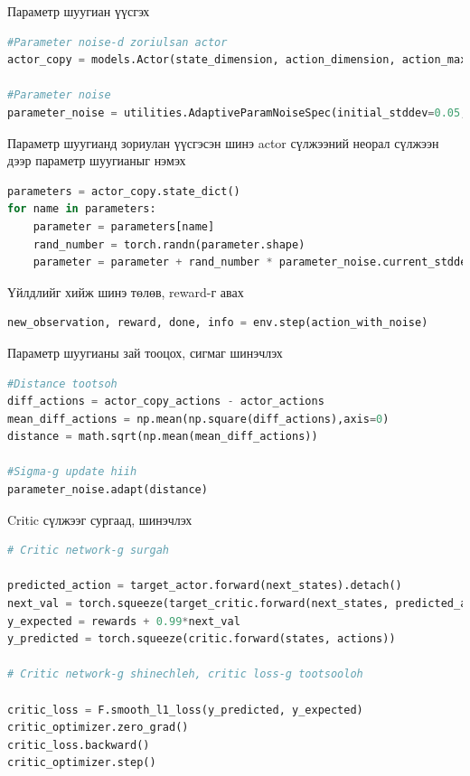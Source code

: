 \documentclass[12pt,A4]{report}
\begin{document}
Параметр шуугиан үүсгэх

\begin{lstlisting}[language=Python, caption=Үйлдэл дээр шуугиан нэмэх, frame=single]
#Parameter noise-d zoriulsan actor
actor_copy = models.Actor(state_dimension, action_dimension, action_max)

#Parameter noise
parameter_noise = utilities.AdaptiveParamNoiseSpec(initial_stddev=0.05,desired_action_stddev=0.3, adaptation_coefficient=1.05)
\end{lstlisting}

Параметр шуугианд зориулан үүсгэсэн шинэ actor сүлжээний неорал сүлжээн дээр параметр шуугианыг нэмэх

\begin{lstlisting}[language=Python, caption=Үйлдэл хийх, frame=single]
parameters = actor_copy.state_dict()
for name in parameters:
    parameter = parameters[name]
    rand_number = torch.randn(parameter.shape)
    parameter = parameter + rand_number * parameter_noise.current_stddev
\end{lstlisting}

Үйлдлийг хийж шинэ төлөв, reward-г авах

\begin{lstlisting}[language=Python, caption=Үйлдэл хийх, frame=single]
new_observation, reward, done, info = env.step(action_with_noise)
\end{lstlisting}

Параметр шуугианы зай тооцох, сигмаг шинэчлэх

\begin{lstlisting}[language=Python, caption=Үйлдэл хийх, frame=single]
#Distance tootsoh
diff_actions = actor_copy_actions - actor_actions
mean_diff_actions = np.mean(np.square(diff_actions),axis=0)
distance = math.sqrt(np.mean(mean_diff_actions))

#Sigma-g update hiih
parameter_noise.adapt(distance)
\end{lstlisting}

Critic сүлжээг сургаад, шинэчлэх

\begin{lstlisting}[language=Python, caption=Critic сүлжээг сургах шинэчлэх, frame=single]
# Critic network-g surgah

predicted_action = target_actor.forward(next_states).detach()
next_val = torch.squeeze(target_critic.forward(next_states, predicted_action).detach())
y_expected = rewards + 0.99*next_val
y_predicted = torch.squeeze(critic.forward(states, actions))

# Critic network-g shinechleh, critic loss-g tootsooloh
            
critic_loss = F.smooth_l1_loss(y_predicted, y_expected)
critic_optimizer.zero_grad()
critic_loss.backward()
critic_optimizer.step()
\end{lstlisting}	
\end{document}
